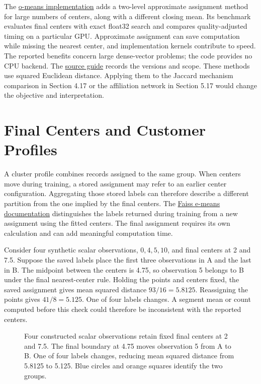 The
\href{https://github.com/owlgebra-ai/faiss/tree/9ecbf0c2a2f4ca7a771b552badc145584b09e1a6/contrib/o_means}{o-means
implementation} adds a two-level approximate assignment method for large
numbers of centers, along with a different closing mean. Its benchmark
evaluates final centers with exact float32 search and compares
quality-adjusted timing on a particular GPU. Approximate assignment can
save computation while missing the nearest center, and implementation
kernels contribute to speed. The reported benefits concern large
dense-vector problems; the code provides no CPU backend. The
\href{../01_Resources/23_Clustering_Optimization/README.md}{source
guide} records the versions and scope. These methods use squared
Euclidean distance. Applying them to the Jaccard mechanism comparison in
Section 4.17 or the affiliation network in Section 5.17 would change the
objective and interpretation.

\hypertarget{M04-final-centers-and-customer-profiles}{%
\section{Final Centers and Customer
Profiles}\label{M04-final-centers-and-customer-profiles}}

\noindent \noindent A cluster profile combines records assigned to the same group.
When centers move during training, a stored assignment may refer to an
earlier center configuration. Aggregating those stored labels can
therefore describe a different partition from the one implied by the
final centers. The
\href{https://github.com/facebookresearch/faiss/tree/ebab8f784c1d177129602269d5ad966c525fbdcb/contrib/e_means}{Faiss
e-means documentation} distinguishes the labels returned during training
from a new assignment using the fitted centers. The final assignment
requires its own calculation and can add meaningful computation time.

Consider four synthetic scalar observations, \(0,4,5,10\), and final
centers at 2 and 7.5. Suppose the saved labels place the first three
observations in A and the last in B. The midpoint between the centers is
4.75, so observation 5 belongs to B under the final nearest-center rule.
Holding the points and centers fixed, the saved assignment gives mean
squared distance \(93/16=5.8125\). Reassigning the points gives
\(41/8=5.125\). One of four labels changes. A segment mean or count
computed before this check could therefore be inconsistent with the
reported centers.

\begin{figure}[htbp]
\centering

\caption{Four constructed scalar observations retain fixed final centers at 2 and 7.5. The final boundary at 4.75 moves observation 5 from A to B. One of four labels changes, reducing mean squared distance from 5.8125 to 5.125. Blue circles and orange squares identify the two groups.}\label{fig:M04_centroid_assignments}
\end{figure}

